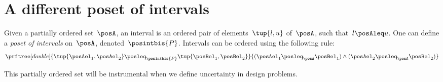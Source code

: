 \section{A different poset of intervals}
\begin{definition}
Given a partially ordered set~$\posA$, an interval is an ordered pair of elements~$\tup{l,u}$ of~$\posA$, such that~$l\posAleq u$.
One can define a \emph{poset of intervals} on~$\posA$, denoted~$\posintbis{P}$. Intervals can be ordered using the following rule:
\begin{equation}
    \prftree[double]{\tup{\posAel_1,\posAel_2}\posleq_{\posintbis{P}}\tup{\posBel_1,\posBel_2}}{(\posAel_1\posleq_\posA \posBel_1) \wedge (\posAel_2\posleq_\posA \posBel_2)}
\end{equation}
\end{definition}

This partially ordered set will be instrumental when we define uncertainty in design problems.